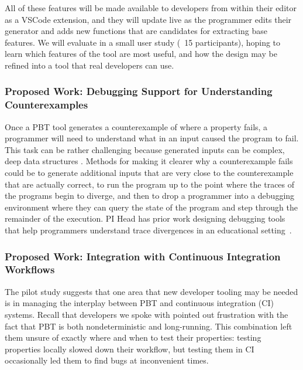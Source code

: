 All of these features will be made available to developers from within their
editor as a VSCode extension, and they will update live as the programmer edits
their generator and adds new functions that are candidates for extracting base
features. We will evaluate \genvis{} in a small user study (~15 participants),
hoping to learn which features of the tool are most useful, and how the design
may be refined into a tool that real developers can use.

\subsubsection{Proposed Work: Debugging Support for Understanding Counterexamples}

Once a PBT tool generates a counterexample of where a property fails, a
programmer will need to understand what in an input caused the program to fail.
This task can be rather challenging because generated inputs can be complex,
deep data structures . Methods for making it clearer why a counterexample
fails could be to generate additional inputs that are very close to the
counterexample that are actually correct, to run the program up to the point
where the traces of the programs begin to diverge, and then to drop a programmer
into a debugging environment where they can query the state of the program and
step through the remainder of the execution. PI Head has prior work designing
debugging tools that help programmers understand trace divergences in an
educational setting~\cite{suzuki2017tracediff}.   

\subsubsection{Proposed Work: Integration with Continuous Integration Workflows}

The pilot study suggests that one area that new developer tooling may be
needed is in managing the interplay between PBT and continuous integration (CI)
systems. Recall that developers we spoke with pointed out frustration with the
fact that PBT is both nondeterministic and long-running. This combination left
them unsure of exactly where and when to test their properties: testing
properties locally slowed down their workflow, but testing them in CI
occasionally led them to find bugs at inconvenient times.

